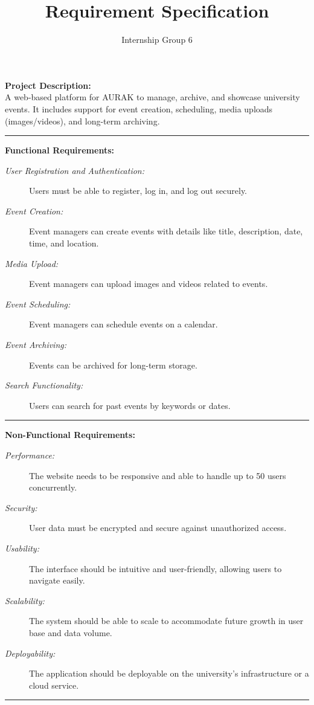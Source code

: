 \documentclass{article}
\title{Requirement Specification}
\author{Internship Group 6}
\begin{document}
\maketitle
\noindent
\textbf{Project Description:}\\
A web-based platform for AURAK to manage, archive, and showcase university events. It includes support for event creation, scheduling, media uploads (images/videos), and long-term archiving.
\par\noindent\rule{\textwidth}{0.5pt}
\textbf{Functional Requirements:}
\begin{description}
    \item[\textit{User Registration and Authentication:}] Users must be able to register, log in, and log out securely.
    \item[\textit{Event Creation:}] Event managers can create events with details like title, description, date, time, and location.
    \item[\textit{Media Upload:}] Event managers can upload images and videos related to events.
    \item[\textit{Event Scheduling:}] Event managers can schedule events on a calendar.
    \item[\textit{Event Archiving:}] Events can be archived for long-term storage.
    \item[\textit{Search Functionality:}] Users can search for past events by keywords or dates.
\end{description}
\par\noindent\rule{\textwidth}{0.5pt}
\textbf{Non-Functional Requirements:}
\begin{description}
    \item[\textit{Performance:}] The website needs to be responsive and able to handle up to 50 users concurrently.
    \item[\textit{Security:}] User data must be encrypted and secure against unauthorized access.
    \item[\textit{Usability:}] The interface should be intuitive and user-friendly, allowing users to navigate easily.
    \item[\textit{Scalability:}] The system should be able to scale to accommodate future growth in user base and data volume.
    \item[\textit{Deployability:}] The application should be deployable on the university's infrastructure or a cloud service.
    \end{description}
\par\noindent\rule{\textwidth}{0.5pt}
\end{document}
